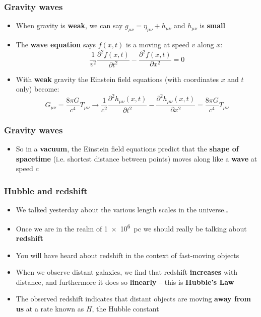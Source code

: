 \documentclass{beamer}
\begin{document}
\begin{frame}
  \frametitle{Gravity waves}
  \begin{itemize}
    \item<1-> When gravity is \textbf{weak}, we can say $g_{\mu\nu}=\eta_{\mu\nu}+h_{\mu\nu}$ and $h_{\mu\nu}$ is \textbf{small}
    \item<2-> The \textbf{wave equation} says $f(x,t)$ is a  moving at speed $v$ along $x$:
      \begin{equation*}
	\frac{1}{v^2}\frac{\partial^2f(x,t)}{\partial t^2}-\frac{\partial^2f(x,t)}{\partial x^2}=0
      \end{equation*}
    \item<3-> With \textbf{weak} gravity the Einstein field equations (with coordinates $x$ and $t$ only) become:
      \begin{equation*}
	G_{\mu\nu}=\frac{8\pi G}{c^4}T_{\mu\nu}\to\frac{1}{c^2}\frac{\partial^2h_{\mu\nu}(x,t)}{\partial t^2}-\frac{\partial^2h_{\mu\nu}(x,t)}{\partial x^2}=\frac{8\pi G}{c^4}T_{\mu\nu}
      \end{equation*}
  \end{itemize}
\end{frame}

\begin{frame}
  \frametitle{Gravity waves}
  \begin{itemize}
    \item<1-> So in a \textbf{vacuum}, the Einstein field equations predict that the \textbf{shape of spacetime} (i.e. shortest distance between points) moves along like a \textbf{wave} at speed $c$
  \end{itemize}
\end{frame}

\begin{frame}
  \frametitle{Hubble and redshift}
  \begin{itemize}
    \item We talked yesterday about the various length scales in the universe\ldots
    \item Once we are in the realm of \SI{1e6}{pc} we should really be talking about \textbf{redshift}
    \item You will have heard about redshift in the context of fast-moving objects
    \item When we observe distant galaxies, we find that redshift \textbf{increases} with distance, and furthermore it does so \textbf{linearly} -- this is \textbf{Hubble's Law}
    \item The observed redshift indicates that distant objects are moving \textbf{away from us} at a rate known as $H$, the Hubble constant
  \end{itemize}
\end{frame}
\end{document}

